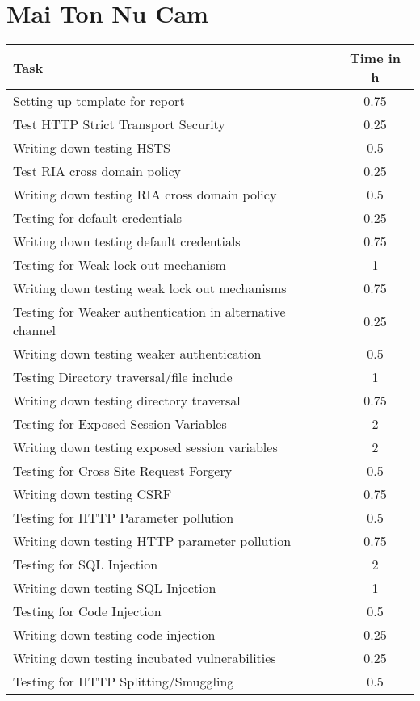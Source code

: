 \section{Mai Ton Nu Cam}
\begin{table}[H]
\tiny
\begin{tabular*}{\textwidth}{@{\extracolsep{\fill}} l c@{\extracolsep{0pt}} }
\textbf{Task} & \textbf{Time in h} \\ \hline
	Setting up template for report				& 0.75 \\
	Test HTTP Strict Transport Security 		& 0.25 \\
	Writing down testing HSTS					& 0.5 \\
	Test RIA cross domain policy 				& 0.25 \\
	Writing down testing RIA cross domain policy & 0.5 \\
	Testing for default credentials 			& 0.25 \\
	Writing down testing default credentials 	& 0.75 \\
	Testing for Weak lock out mechanism 		& 1 \\
	Writing down testing weak lock out mechanisms & 0.75 \\
	Testing for Weaker authentication in alternative channel & 0.25 \\
	Writing down testing weaker authentication 	& 0.5 \\
	Testing Directory traversal/file include	& 1 \\
	Writing down testing directory traversal	& 0.75 \\
	Testing for Exposed Session Variables		& 2 \\
	Writing down testing exposed session variables & 2 \\
	Testing for Cross Site Request Forgery		& 0.5 \\
	Writing down testing CSRF					& 0.75 \\
	Testing for HTTP Parameter pollution		& 0.5 \\
	Writing down testing HTTP parameter pollution & 0.75 \\
	Testing for SQL Injection					& 2 \\
	Writing down testing SQL Injection 			& 1 \\
	Testing for Code Injection					& 0.5 \\
	Writing down testing code injection 		& 0.25 \\
	Writing down testing incubated vulnerabilities & 0.25 \\
	Testing for HTTP Splitting/Smuggling		& 0.5 \\

\end{tabular*}
\end{table}

